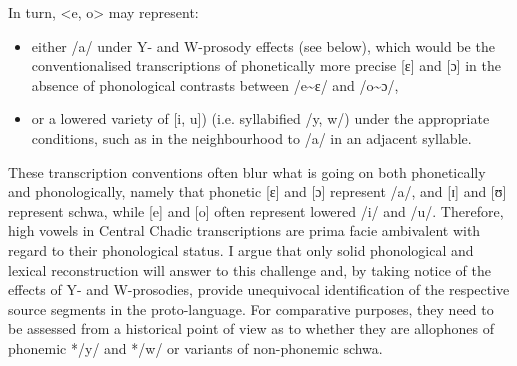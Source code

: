\documentclass[output=paper]{langscibook}
\begin{document}
In turn, <e, o> may represent:

\begin{itemize}
\item either /a/ under Y- and W-prosody effects (see below), which would be the conventionalised transcriptions of phonetically more precise [ɛ] and [ɔ] in the absence of phonological contrasts between /e{\textasciitilde}ɛ/ and /o{\textasciitilde}ɔ/,
\item or a lowered variety of [i, u]) (i.e. syllabified /y, w/) under the appropriate conditions, such as in the neighbourhood to /a/ in an adjacent syllable. 
\end{itemize}

These transcription conventions often blur what is going on both phonetically and phonologically, namely that phonetic [ε] and [ɔ] represent /a/, and [ɪ] and [ʊ] represent schwa, while [e] and [o] often represent lowered /i/ and /u/. Therefore, high vowels in Central Chadic transcriptions are prima facie ambivalent with regard to their phonological status. I argue that only solid phonological and lexical reconstruction will answer to this challenge and, by taking notice of the effects of Y- and W-prosodies, provide unequivocal identification of the respective source segments in the proto-language. For comparative purposes, they need to be assessed from a historical point of view as to whether they are allophones of phonemic */y/ and */w/ or variants of non-phonemic schwa.
\end{document}
